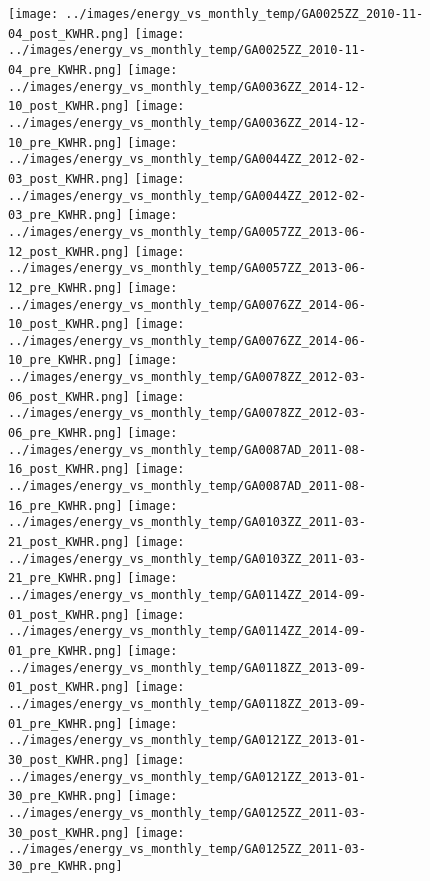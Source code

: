 \clearpage
\begin{figure}
\centering
\texttt{[image: ../images/energy\_vs\_monthly\_temp/GA0025ZZ\_2010-11-04\_post\_KWHR.png]}
\texttt{[image: ../images/energy\_vs\_monthly\_temp/GA0025ZZ\_2010-11-04\_pre\_KWHR.png]}
\texttt{[image: ../images/energy\_vs\_monthly\_temp/GA0036ZZ\_2014-12-10\_post\_KWHR.png]}
\texttt{[image: ../images/energy\_vs\_monthly\_temp/GA0036ZZ\_2014-12-10\_pre\_KWHR.png]}
\texttt{[image: ../images/energy\_vs\_monthly\_temp/GA0044ZZ\_2012-02-03\_post\_KWHR.png]}
\texttt{[image: ../images/energy\_vs\_monthly\_temp/GA0044ZZ\_2012-02-03\_pre\_KWHR.png]}
\texttt{[image: ../images/energy\_vs\_monthly\_temp/GA0057ZZ\_2013-06-12\_post\_KWHR.png]}
\texttt{[image: ../images/energy\_vs\_monthly\_temp/GA0057ZZ\_2013-06-12\_pre\_KWHR.png]}
\texttt{[image: ../images/energy\_vs\_monthly\_temp/GA0076ZZ\_2014-06-10\_post\_KWHR.png]}
\texttt{[image: ../images/energy\_vs\_monthly\_temp/GA0076ZZ\_2014-06-10\_pre\_KWHR.png]}
\texttt{[image: ../images/energy\_vs\_monthly\_temp/GA0078ZZ\_2012-03-06\_post\_KWHR.png]}
\texttt{[image: ../images/energy\_vs\_monthly\_temp/GA0078ZZ\_2012-03-06\_pre\_KWHR.png]}
\texttt{[image: ../images/energy\_vs\_monthly\_temp/GA0087AD\_2011-08-16\_post\_KWHR.png]}
\texttt{[image: ../images/energy\_vs\_monthly\_temp/GA0087AD\_2011-08-16\_pre\_KWHR.png]}
\texttt{[image: ../images/energy\_vs\_monthly\_temp/GA0103ZZ\_2011-03-21\_post\_KWHR.png]}
\texttt{[image: ../images/energy\_vs\_monthly\_temp/GA0103ZZ\_2011-03-21\_pre\_KWHR.png]}
\texttt{[image: ../images/energy\_vs\_monthly\_temp/GA0114ZZ\_2014-09-01\_post\_KWHR.png]}
\texttt{[image: ../images/energy\_vs\_monthly\_temp/GA0114ZZ\_2014-09-01\_pre\_KWHR.png]}
\texttt{[image: ../images/energy\_vs\_monthly\_temp/GA0118ZZ\_2013-09-01\_post\_KWHR.png]}
\texttt{[image: ../images/energy\_vs\_monthly\_temp/GA0118ZZ\_2013-09-01\_pre\_KWHR.png]}
\texttt{[image: ../images/energy\_vs\_monthly\_temp/GA0121ZZ\_2013-01-30\_post\_KWHR.png]}
\texttt{[image: ../images/energy\_vs\_monthly\_temp/GA0121ZZ\_2013-01-30\_pre\_KWHR.png]}
\texttt{[image: ../images/energy\_vs\_monthly\_temp/GA0125ZZ\_2011-03-30\_post\_KWHR.png]}
\texttt{[image: ../images/energy\_vs\_monthly\_temp/GA0125ZZ\_2011-03-30\_pre\_KWHR.png]}
\end{figure}
